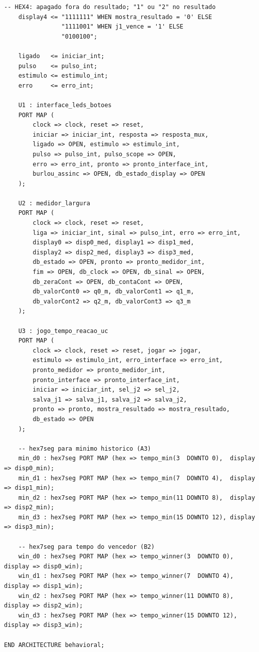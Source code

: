 \documentclass[12pt,a4paper]{article}
\begin{document}
\begin{lstlisting}[caption={Top-Level -- \texttt{jogo\_tempo\_reacao.vhd}},
                   label={lst:top}]
    -- HEX4: apagado fora do resultado; "1" ou "2" no resultado
    display4 <= "1111111" WHEN mostra_resultado = '0' ELSE
                "1111001" WHEN j1_vence = '1' ELSE
                "0100100";

    ligado   <= iniciar_int;
    pulso    <= pulso_int;
    estimulo <= estimulo_int;
    erro     <= erro_int;

    U1 : interface_leds_botoes
    PORT MAP (
        clock => clock, reset => reset,
        iniciar => iniciar_int, resposta => resposta_mux,
        ligado => OPEN, estimulo => estimulo_int,
        pulso => pulso_int, pulso_scope => OPEN,
        erro => erro_int, pronto => pronto_interface_int,
        burlou_assinc => OPEN, db_estado_display => OPEN
    );

    U2 : medidor_largura
    PORT MAP (
        clock => clock, reset => reset,
        liga => iniciar_int, sinal => pulso_int, erro => erro_int,
        display0 => disp0_med, display1 => disp1_med,
        display2 => disp2_med, display3 => disp3_med,
        db_estado => OPEN, pronto => pronto_medidor_int,
        fim => OPEN, db_clock => OPEN, db_sinal => OPEN,
        db_zeraCont => OPEN, db_contaCont => OPEN,
        db_valorCont0 => q0_m, db_valorCont1 => q1_m,
        db_valorCont2 => q2_m, db_valorCont3 => q3_m
    );

    U3 : jogo_tempo_reacao_uc
    PORT MAP (
        clock => clock, reset => reset, jogar => jogar,
        estimulo => estimulo_int, erro_interface => erro_int,
        pronto_medidor => pronto_medidor_int,
        pronto_interface => pronto_interface_int,
        iniciar => iniciar_int, sel_j2 => sel_j2,
        salva_j1 => salva_j1, salva_j2 => salva_j2,
        pronto => pronto, mostra_resultado => mostra_resultado,
        db_estado => OPEN
    );

    -- hex7seg para minimo historico (A3)
    min_d0 : hex7seg PORT MAP (hex => tempo_min(3  DOWNTO 0),  display => disp0_min);
    min_d1 : hex7seg PORT MAP (hex => tempo_min(7  DOWNTO 4),  display => disp1_min);
    min_d2 : hex7seg PORT MAP (hex => tempo_min(11 DOWNTO 8),  display => disp2_min);
    min_d3 : hex7seg PORT MAP (hex => tempo_min(15 DOWNTO 12), display => disp3_min);

    -- hex7seg para tempo do vencedor (B2)
    win_d0 : hex7seg PORT MAP (hex => tempo_winner(3  DOWNTO 0),  display => disp0_win);
    win_d1 : hex7seg PORT MAP (hex => tempo_winner(7  DOWNTO 4),  display => disp1_win);
    win_d2 : hex7seg PORT MAP (hex => tempo_winner(11 DOWNTO 8),  display => disp2_win);
    win_d3 : hex7seg PORT MAP (hex => tempo_winner(15 DOWNTO 12), display => disp3_win);

END ARCHITECTURE behavioral;
\end{lstlisting}
\end{document}
